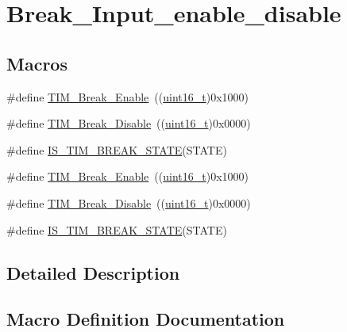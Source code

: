 \hypertarget{group___break___input__enable__disable}{}\section{Break\+\_\+\+Input\+\_\+enable\+\_\+disable}
\label{group___break___input__enable__disable}
\subsection*{Macros}
\begin{DoxyCompactItemize}
\item 
\#define \hyperlink{group___break___input__enable__disable_gae7fbc11ac043454b2a880bffe98fdb8c}{T\+I\+M\+\_\+\+Break\+\_\+\+Enable}~((\hyperlink{_p_e___types_8h_a1f1825b69244eb3ad2c7165ddc99c956}{uint16\+\_\+t})0x1000)
\item 
\#define \hyperlink{group___break___input__enable__disable_ga31ba16dd70ad4d99adc911f7bf6662e5}{T\+I\+M\+\_\+\+Break\+\_\+\+Disable}~((\hyperlink{_p_e___types_8h_a1f1825b69244eb3ad2c7165ddc99c956}{uint16\+\_\+t})0x0000)
\item 
\#define \hyperlink{group___break___input__enable__disable_ga29dd5484bdc69a467387bd8059b69f0e}{I\+S\+\_\+\+T\+I\+M\+\_\+\+B\+R\+E\+A\+K\+\_\+\+S\+T\+A\+TE}(S\+T\+A\+TE)
\item 
\#define \hyperlink{group___break___input__enable__disable_gae7fbc11ac043454b2a880bffe98fdb8c}{T\+I\+M\+\_\+\+Break\+\_\+\+Enable}~((\hyperlink{_p_e___types_8h_a1f1825b69244eb3ad2c7165ddc99c956}{uint16\+\_\+t})0x1000)
\item 
\#define \hyperlink{group___break___input__enable__disable_ga31ba16dd70ad4d99adc911f7bf6662e5}{T\+I\+M\+\_\+\+Break\+\_\+\+Disable}~((\hyperlink{_p_e___types_8h_a1f1825b69244eb3ad2c7165ddc99c956}{uint16\+\_\+t})0x0000)
\item 
\#define \hyperlink{group___break___input__enable__disable_ga29dd5484bdc69a467387bd8059b69f0e}{I\+S\+\_\+\+T\+I\+M\+\_\+\+B\+R\+E\+A\+K\+\_\+\+S\+T\+A\+TE}(S\+T\+A\+TE)
\end{DoxyCompactItemize}


\subsection{Detailed Description}


\subsection{Macro Definition Documentation}
